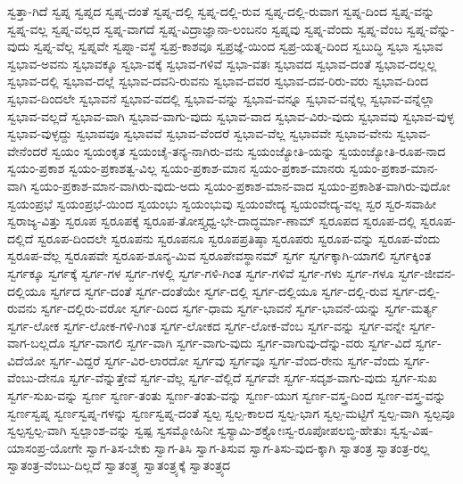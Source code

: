 {ಸ್ವತ್ತಾ-ಗಿದೆ
ಸ್ವಪ್ನ
ಸ್ವಪ್ನದ
ಸ್ವಪ್ನ-ದಂತೆ
ಸ್ವಪ್ನ-ದಲ್ಲಿ
ಸ್ವಪ್ನ-ದಲ್ಲಿ-ರುವ
ಸ್ವಪ್ನ-ದಲ್ಲಿ-ರುವಾಗ
ಸ್ವಪ್ನ-ದಿಂದ
ಸ್ವಪ್ನ-ವನ್ನು
ಸ್ವಪ್ನ-ವಲ್ಲ
ಸ್ವಪ್ನ-ವಲ್ಲದ
ಸ್ವಪ್ನ-ವಾಗದೆ
ಸ್ವಪ್ನ-ವಿದ್ರಾಜ್ಞಾನಾ-ಲಂಬನಂ
ಸ್ವಪ್ನವು
ಸ್ವಪ್ನ-ವೆಂದು
ಸ್ವಪ್ನ-ವೆಂಬ
ಸ್ವಪ್ನ-ವೆನ್ನು-ವುದು
ಸ್ವಪ್ನ-ವೆಲ್ಲ
ಸ್ವಪ್ನವೇ
ಸ್ವಪ್ನಾ-ವಸ್ಥೆ
ಸ್ವಪ್ರ-ಕಾಶವೂ
ಸ್ವಪ್ರಜ್ಞೆ-ಯಿಂದ
ಸ್ವಪ್ರ-ಯತ್ನ-ದಿಂದ
ಸ್ವಬುದ್ಧಿ
ಸ್ವಭಾ
ಸ್ವಭಾವ
ಸ್ವಭಾವ-ಅವನು
ಸ್ವಭಾವಕ್ಕೂ
ಸ್ವಭಾ-ವಕ್ಕೆ
ಸ್ವಭಾವ-ಗಳಿವೆ
ಸ್ವಭಾ-ವತಃ
ಸ್ವಭಾವದ
ಸ್ವಭಾವ-ದಂತೆ
ಸ್ವಭಾವ-ದಲ್ಲಲ್ಲ
ಸ್ವಭಾವ-ದಲ್ಲಿ
ಸ್ವಭಾವ-ದಲ್ಲೆ
ಸ್ವಭಾವ-ದವನಿ-ರುವನು
ಸ್ವಭಾವ-ದವರ
ಸ್ವಭಾವ-ದವ-ರಿರು-ವರು
ಸ್ವಭಾವ-ದಿಂದ
ಸ್ವಭಾವ-ದಿಂದಲೇ
ಸ್ವಭಾವನೆ
ಸ್ವಭಾವ-ವದಲ್ಲಿ
ಸ್ವಭಾವ-ವನ್ನು
ಸ್ವಭಾವ-ವನ್ನೂ
ಸ್ವಭಾವ-ವನ್ನೆಲ್ಲ
ಸ್ವಭಾವ-ವನ್ನೆಲ್ಲಾ
ಸ್ವಭಾವ-ವಲ್ಲದೆ
ಸ್ವಭಾವ-ವಾಗಿ
ಸ್ವಭಾವ-ವಾಗು-ವುದು
ಸ್ವಭಾವ-ವಾದ
ಸ್ವಭಾವ-ವಿರು-ವುದು
ಸ್ವಭಾವವು
ಸ್ವಭಾವ-ವುಳ್ಳ
ಸ್ವಭಾವ-ವುಳ್ಳದ್ದು
ಸ್ವಭಾವವೂ
ಸ್ವಭಾವವೆ
ಸ್ವಭಾವ-ವೆಂದರೆ
ಸ್ವಭಾವ-ವೆಲ್ಲ
ಸ್ವಭಾವವೇ
ಸ್ವಭಾವ-ವೇನು
ಸ್ವಭಾವ-ವೇನೆಂದರೆ
ಸ್ವಯಂ
ಸ್ವಯಂಕೃತ
ಸ್ವಯಂಚೈ-ತನ್ಯ-ನಾಗಿರು-ವನು
ಸ್ವಯಂಜ್ಯೋತಿ-ಯನ್ನು
ಸ್ವಯಂಜ್ಯೋತಿ-ರೂಪ-ನಾದ
ಸ್ವಯಂ-ಪ್ರಕಾಶ
ಸ್ವಯಂ-ಪ್ರಕಾಶತ್ವ-ವಿಲ್ಲ
ಸ್ವಯಂ-ಪ್ರಕಾಶ-ಮಾನ
ಸ್ವಯಂ-ಪ್ರಕಾಶ-ಮಾನರು
ಸ್ವಯಂ-ಪ್ರಕಾಶ-ಮಾನ-ವಾಗಿ
ಸ್ವಯಂ-ಪ್ರಕಾಶ-ಮಾನ-ವಾಗಿರು-ವುದು-ಅದು
ಸ್ವಯಂ-ಪ್ರಕಾಶ-ಮಾನ-ವಾದ
ಸ್ವಯಂ-ಪ್ರಕಾಶಿತ-ವಾಗಿರು-ವುದೋ
ಸ್ವಯಂಪ್ರಭೆ
ಸ್ವಯಂಪ್ರಭೆ-ಯಿಂದ
ಸ್ವಯಂಭು
ಸ್ವಯಂಭುವು
ಸ್ವಯಂವೇದ್ಯ
ಸ್ವಯಂವೇದ್ಯ-ವಲ್ಲ
ಸ್ವರ
ಸ್ವರ-ಸವಾಹೀ
ಸ್ವರಾಜ್ಯ-ವಿತ್ತು
ಸ್ವರೂಪ
ಸ್ವರೂಪಕ್ಕೆ
ಸ್ವರೂಪ-ತೋಸ್ತ್ಯಧ್ವ-ಭೇ-ದಾದ್ಧರ್ಮಾ-ಣಾಮ್
ಸ್ವರೂಪದ
ಸ್ವರೂಪ-ದಲ್ಲಿ
ಸ್ವರೂಪ-ದಲ್ಲಿದೆ
ಸ್ವರೂಪ-ದಿಂದಲೇ
ಸ್ವರೂಪನು
ಸ್ವರೂಪನೂ
ಸ್ವರೂಪಪ್ರತಿಷ್ಠಾ
ಸ್ವರೂಪರು
ಸ್ವರೂಪ-ವನ್ನು
ಸ್ವರೂಪ-ವೆಂದು
ಸ್ವರೂಪ-ವೆಲ್ಲ
ಸ್ವರೂಪವೇ
ಸ್ವರೂಪ-ಶೂನ್ಯ-ಮಿವ
ಸ್ವರೂಪೇವಸ್ಥಾನಮ್
ಸ್ವರ್ಗ
ಸ್ವರ್ಗಕ್ಕಾಗಿ-ಯಾಗಲಿ
ಸ್ವರ್ಗಕ್ಕಿಂತ
ಸ್ವರ್ಗಕ್ಕೂ
ಸ್ವರ್ಗಕ್ಕೆ
ಸ್ವರ್ಗ-ಗಳ
ಸ್ವರ್ಗ-ಗಳಲ್ಲಿ
ಸ್ವರ್ಗ-ಗಳಿ-ಗಿಂತ
ಸ್ವರ್ಗ-ಗಳಿವೆ
ಸ್ವರ್ಗ-ಗಳು
ಸ್ವರ್ಗ-ಗಳೂ
ಸ್ವರ್ಗ-ಜೀವನ-ದಲ್ಲಿಯೂ
ಸ್ವರ್ಗದ
ಸ್ವರ್ಗ-ದಂತೆ
ಸ್ವರ್ಗ-ದಂತೆಯೇ
ಸ್ವರ್ಗ-ದಲ್ಲಿ
ಸ್ವರ್ಗ-ದಲ್ಲಿಯೂ
ಸ್ವರ್ಗ-ದಲ್ಲಿ-ರುವ
ಸ್ವರ್ಗ-ದಲ್ಲಿ-ರುವನು
ಸ್ವರ್ಗ-ದಲ್ಲಿರು-ವರೋ
ಸ್ವರ್ಗ-ದಿಂದ
ಸ್ವರ್ಗ-ಧಾಮ
ಸ್ವರ್ಗ-ಭಾವನೆ
ಸ್ವರ್ಗ-ಭಾವನೆ-ಯನ್ನು
ಸ್ವರ್ಗ-ಮರ್ತ್ಯ
ಸ್ವರ್ಗ-ಲೋಕ
ಸ್ವರ್ಗ-ಲೋಕ-ಗಳಿ-ಗಿಂತ
ಸ್ವರ್ಗ-ಲೋಕದ
ಸ್ವರ್ಗ-ಲೋಕ-ವೆಂಬ
ಸ್ವರ್ಗ-ವನ್ನು
ಸ್ವರ್ಗ-ವನ್ನೇ
ಸ್ವರ್ಗ-ವಾಗ-ಬಲ್ಲದೊ
ಸ್ವರ್ಗ-ವಾಗಲಿ
ಸ್ವರ್ಗ-ವಾಗಿ
ಸ್ವರ್ಗ-ವಾಗು-ವುದು
ಸ್ವರ್ಗ-ವಾಗುವು-ದೆನ್ನು-ವರು
ಸ್ವರ್ಗ-ವಿದೆ
ಸ್ವರ್ಗ-ವಿದೆಯೋ
ಸ್ವರ್ಗ-ವಿದ್ದರೆ
ಸ್ವರ್ಗ-ವಿರ-ಲಾರದೋ
ಸ್ವರ್ಗವು
ಸ್ವರ್ಗವೂ
ಸ್ವರ್ಗ-ವೆಂದ-ರೇನು
ಸ್ವರ್ಗ-ವೆಂದು
ಸ್ವರ್ಗ-ವೆಂಬು-ದೇನೂ
ಸ್ವರ್ಗ-ವೆನ್ನುತ್ತೇವೆ
ಸ್ವರ್ಗ-ವೆಲ್ಲ
ಸ್ವರ್ಗ-ವೆಲ್ಲಿದೆ
ಸ್ವರ್ಗವೇ
ಸ್ವರ್ಗ-ಸದೃಶ-ವಾಗು-ವುದು
ಸ್ವರ್ಗ-ಸುಖ
ಸ್ವರ್ಗ-ಸುಖ-ವನ್ನು
ಸ್ವರ್ಣ
ಸ್ವರ್ಣ-ತಂತು
ಸ್ವರ್ಣ-ತಂತು-ವನ್ನು
ಸ್ವರ್ಣ-ಯುಗ
ಸ್ವರ್ಣ-ವಸ್ತ್ರ-ದಿಂದ
ಸ್ವರ್ಣ-ವಸ್ತ್ರ-ವನ್ನು
ಸ್ವರ್ಣಸ್ವಪ್ನ
ಸ್ವರ್ಣಸ್ವಪ್ನ-ಗಳನ್ನು
ಸ್ವರ್ಣಸ್ವಪ್ನ-ದಂತೆ
ಸ್ವಲ್ಪ
ಸ್ವಲ್ಪ-ಕಾಲದ
ಸ್ವಲ್ಪ-ಭಾಗ
ಸ್ವಲ್ಪ-ಮಟ್ಟಿಗೆ
ಸ್ವಲ್ಪ-ವಾಗಿ
ಸ್ವಲ್ಪವೂ
ಸ್ವಲ್ಪಸ್ವಲ್ಪ-ವಾಗಿ
ಸ್ವಲ್ಪಾಂಶ-ವನ್ನು
ಸ್ವಷ್ಪ
ಸ್ವಸಮ್ಮೋಹಿನೀ
ಸ್ವಸ್ಯಾಮಿ-ಶಕ್ತ್ಯೋಃಸ್ವ-ರೂಪೋಪಲಬ್ಧಿ-ಹೇತುಃ
ಸ್ವಸ್ವ-ವಿಷ-ಯಾಸಂಪ್ರ-ಯೋಗೇ
ಸ್ವಾಗ-ತಿಸ-ಬೇಕು
ಸ್ವಾಗ-ತಿಸಿ
ಸ್ವಾಗ-ತಿಸುವ
ಸ್ವಾಗ-ತಿಸು-ವುದ-ಕ್ಕಾಗಿ
ಸ್ವಾತಂತ್ರ
ಸ್ವಾತಂತ್ರ-ರಲ್ಲ
ಸ್ವಾತಂತ್ರ-ವೆಂಬು-ದಿಲ್ಲದೆ
ಸ್ವಾತಂತ್ರ್ಯ
ಸ್ವಾತಂತ್ರ್ಯಕ್ಕೆ
ಸ್ವಾತಂತ್ರ್ಯದ
}
